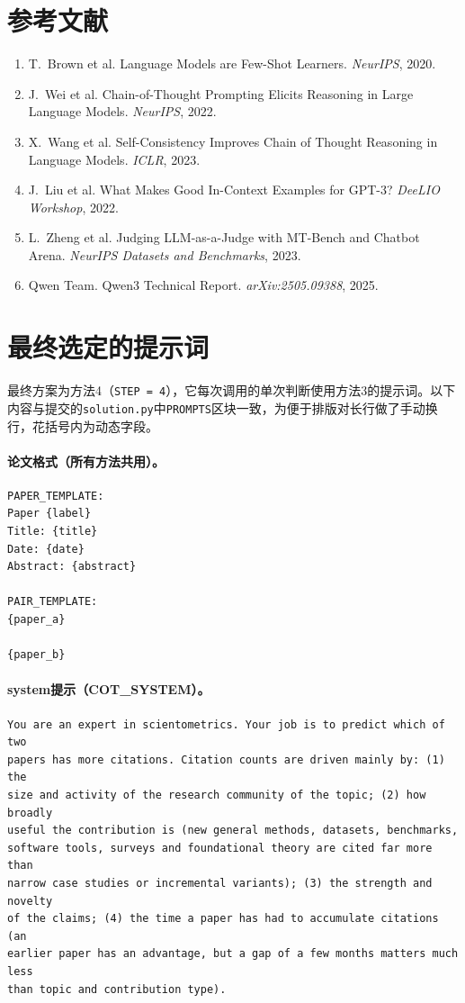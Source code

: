\documentclass{article}
\begin{document}
\clearpage
\section*{参考文献}
\begin{enumerate}
\small
\item T.~Brown et al. Language Models are Few-Shot Learners. \emph{NeurIPS}, 2020.
\item J.~Wei et al. Chain-of-Thought Prompting Elicits Reasoning in Large Language Models. \emph{NeurIPS}, 2022.
\item X.~Wang et al. Self-Consistency Improves Chain of Thought Reasoning in Language Models. \emph{ICLR}, 2023.
\item J.~Liu et al. What Makes Good In-Context Examples for GPT-3? \emph{DeeLIO Workshop}, 2022.
\item L.~Zheng et al. Judging LLM-as-a-Judge with MT-Bench and Chatbot Arena. \emph{NeurIPS Datasets and Benchmarks}, 2023.
\item Qwen Team. Qwen3 Technical Report. \emph{arXiv:2505.09388}, 2025.
\end{enumerate}

\appendix
\section{最终选定的提示词}
最终方案为方法4（\texttt{STEP = 4}），它每次调用的单次判断使用方法3的提示词。以下内容与提交的\texttt{solution.py}中\texttt{PROMPTS}区块一致，为便于排版对长行做了手动换行，花括号内为动态字段。

\paragraph{论文格式（所有方法共用）。}
\begin{Verbatim}[fontsize=\small,frame=single]
PAPER_TEMPLATE:
Paper {label}
Title: {title}
Date: {date}
Abstract: {abstract}

PAIR_TEMPLATE:
{paper_a}

{paper_b}
\end{Verbatim}

\paragraph{system提示（COT\_SYSTEM）。}
\begin{Verbatim}[fontsize=\small,frame=single]
You are an expert in scientometrics. Your job is to predict which of two
papers has more citations. Citation counts are driven mainly by: (1) the
size and activity of the research community of the topic; (2) how broadly
useful the contribution is (new general methods, datasets, benchmarks,
software tools, surveys and foundational theory are cited far more than
narrow case studies or incremental variants); (3) the strength and novelty
of the claims; (4) the time a paper has had to accumulate citations (an
earlier paper has an advantage, but a gap of a few months matters much less
than topic and contribution type).
\end{Verbatim}
\end{document}
